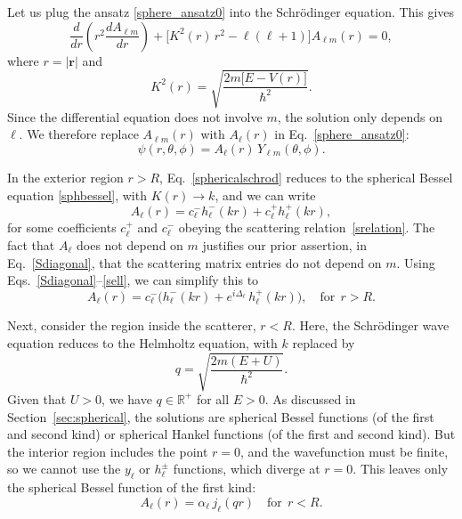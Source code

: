 \documentclass[prx,12pt]{revtex4-2}
\begin{document}
Let us plug the ansatz \eqref{sphere_ansatz0} into the Schr\"odinger
equation.  This gives
\begin{equation}
  \frac{d}{dr}\left(r^2\frac{dA_{\ell m}}{dr}\right)
  + \Big[K^2(r)\, r^2 - \ell(\ell+1)\Big] A_{\ell m}(r) = 0,
  \label{sphericalschrod}
\end{equation}
where $r = |\mathbf{r}|$ and
\begin{equation}
  K^2(r) = \sqrt{\frac{2m\big[E-V(r)\big]}{\hbar^2}}.
\end{equation}
Since the differential equation does not involve $m$, the solution
only depends on $\ell$.  We therefore replace $A_{\ell m}(r)$ with
$A_\ell(r)$ in Eq.~\eqref{sphere_ansatz0}:
\begin{equation}
  \psi(r,\theta,\phi) = A_{\ell}(r) \, Y_{\ell m}(\theta, \phi).
\end{equation}

In the exterior region $r > R$, Eq.~\eqref{sphericalschrod} reduces to
the spherical Bessel equation \eqref{sphbessel}, with $K(r)
\rightarrow k$, and we can write
\begin{equation}
  A_{\ell}(r) = c^-_\ell h^-_\ell(kr) + c^+_\ell h^+_\ell(kr),
  \label{aell}
\end{equation}
for some coefficients $c^+_\ell$ and $c^-_\ell$ obeying the scattering
relation~\eqref{srelation}.  The fact that $A_{\ell}$ does not depend
on $m$ justifies our prior assertion, in Eq.~\eqref{Sdiagonal}, that
the scattering matrix entries do not depend on $m$.  Using
Eqs.~\eqref{Sdiagonal}--\eqref{sell}, we can simplify this to
\begin{equation}
  A_\ell(r) = c^-_\ell \Big(h^-_\ell(kr) + e^{i\Delta_\ell}\, h^+_\ell(kr)\Big),
  \quad \textrm{for}\,\;r > R.
  \label{Aoutside}
\end{equation}

Next, consider the region inside the scatterer, $r < R$.  Here, the
Schr\"odinger wave equation reduces to the Helmholtz equation, with
$k$ replaced by
\begin{equation}
  q = \sqrt{\frac{2m(E+U)}{\hbar^2}}.
\end{equation}
Given that $U > 0$, we have $q \in \mathbb{R}^+$ for all $E > 0$.  As
discussed in Section~\ref{sec:spherical}, the solutions are spherical
Bessel functions (of the first and second kind) or spherical Hankel
functions (of the first and second kind).  But the interior region
includes the point $r = 0$, and the wavefunction must be finite, so we
cannot use the $y_\ell$ or $h_\ell^\pm$ functions, which diverge at $r
= 0$.  This leaves only the spherical Bessel function of the first
kind:
\begin{equation}
  A_{\ell}(r) = \alpha_\ell \, j_\ell(qr)
  \quad \textrm{for}\,\;r < R.
  \label{Ainside}
\end{equation}
\end{document}
